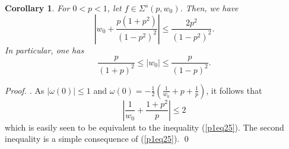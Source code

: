 \documentclass[leqno,
12pt]{amsart}
\newtheorem{cor}{Corollary}[section]
\theoremstyle{definition}
\newenvironment{pf}[1][]{ \vskip 3mm
 \noindent
 \ifthenelse{\equal{#1}{}}  {{\slshape Proof. }}  {{\slshape #1.} } }{\qed\bigskip}
\begin{document}
\begin{cor}
For $0<p<1$, let  $f\in \Sigma^s(p, w_0)$. Then, we have
\begin{equation}\label{p1eq25}
\left |w_0+\frac{p(1+p^2)}{(1-p^2)^2}\right |\leq \frac{2p^2}{(1-p^2)^2} .
\end{equation}
In particular, one has
$$\frac{p}{(1+p)^2}\leq |w_0|\leq \frac{p}{(1-p)^2}.
$$
\end{cor} \begin{pf}
As $|\omega(0)|\leq 1$ and $\omega(0)= -\frac{1}{2} (\frac{1}{w_0}+p+\frac{1}{p})$,
it follows that
$$\left | \frac{1}{w_0}+\frac{1+p^2}{p}\right |\leq 2
$$
which is easily seen to be equivalent to the inequality (\ref{p1eq25}). The second inequality is a simple
consequence of  (\ref{p1eq25}).
\end{pf}
\end{document}
